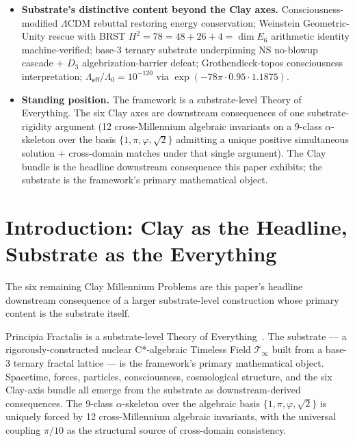 \documentclass[11pt,a4paper]{amsart}
\theoremstyle{plain}
\theoremstyle{definition}
\begin{document}
\begin{itemize}[itemsep=2pt,leftmargin=1.4em]
\item \textbf{Substrate's distinctive content beyond the Clay axes.} Consciousness-modified $\Lambda$CDM rebuttal restoring energy conservation; Weinstein Geometric-Unity rescue with BRST $H^2 = 78 = 48 + 26 + 4 = \dim E_6$ arithmetic identity machine-verified; base-3 ternary substrate underpinning NS no-blowup cascade + $D_3$ algebrization-barrier defeat; Grothendieck-topos consciousness interpretation; $\Lambda_{\textsf{eff}}/\Lambda_0 = 10^{-120}$ via $\exp(-78\pi \cdot 0.95 \cdot 1.1875)$.
\item \textbf{Standing position.} The framework is a substrate-level Theory of Everything. The six Clay axes are downstream consequences of one substrate-rigidity argument (12 cross-Millennium algebraic invariants on a 9-class $\alpha$-skeleton over the basis $\{1, \pi, \varphi, \sqrt{2}\}$ admitting a unique positive simultaneous solution + cross-domain matches under that single argument). The Clay bundle is the headline downstream consequence this paper exhibits; the substrate is the framework's primary mathematical object.
\end{itemize}

\tableofcontents

\section{Introduction: Clay as the Headline, Substrate as the Everything}\label{sec:intro}

The six remaining Clay Millennium Problems are this paper's headline downstream consequence of a larger substrate-level construction whose primary content is the substrate itself.

Principia Fractalis is a substrate-level Theory of Everything~\cite{cohen2026book,cohen2025unifiedClay,cohen2026corroborating}. The substrate --- a rigorously-constructed nuclear C*-algebraic Timeless Field $\mathcal{T}_\infty$ built from a base-3 ternary fractal lattice --- is the framework's primary mathematical object. Spacetime, forces, particles, consciousness, cosmological structure, and the six Clay-axis bundle all emerge from the substrate as downstream-derived consequences. The 9-class $\alpha$-skeleton over the algebraic basis $\{1, \pi, \varphi, \sqrt{2}\}$ is uniquely forced by 12 cross-Millennium algebraic invariants, with the universal coupling $\pi/10$ as the structural source of cross-domain consistency.
\end{document}
